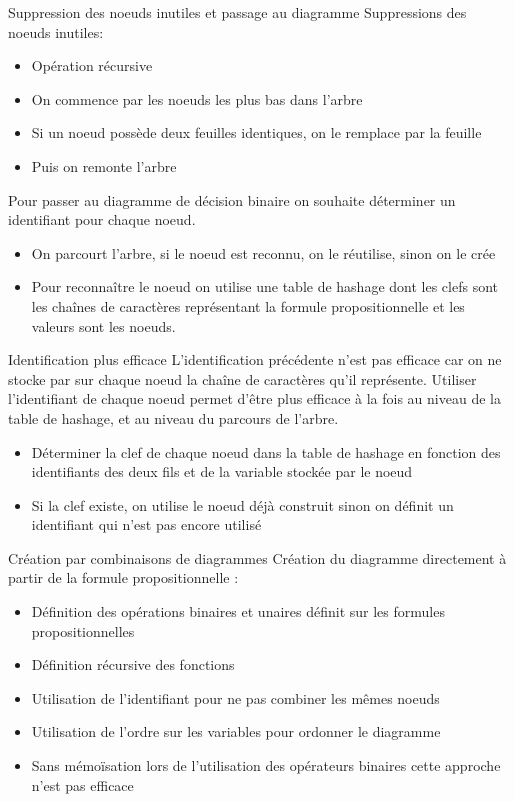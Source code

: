\documentclass{beamer}
\begin{document}
\begin{frame}{Suppression des noeuds inutiles et passage au diagramme}
Suppressions des noeuds inutiles:
\begin{itemize}
\item Opération récursive
\item On commence par les noeuds les plus bas dans l'arbre
\item Si un noeud possède deux feuilles identiques, on le remplace par la feuille
\item Puis on remonte l'arbre
\end{itemize}
Pour passer au diagramme de décision binaire on souhaite déterminer un identifiant pour chaque noeud.
\begin{itemize}
\item On parcourt l'arbre, si le noeud est reconnu, on le réutilise, sinon on le crée
\item Pour reconnaître le noeud on utilise une table de hashage dont les clefs sont les chaînes de caractères représentant la formule propositionnelle et les valeurs sont les noeuds.
\end{itemize}
\end{frame}

\begin{frame}{Identification plus efficace}
L'identification précédente n'est pas efficace car on ne stocke par sur chaque noeud la chaîne de caractères qu'il représente. Utiliser l'identifiant de chaque noeud permet d'être plus efficace à la fois au niveau de la table de hashage, et au niveau du parcours de l'arbre.
\begin{itemize}
\item Déterminer la clef de chaque noeud dans la table de hashage en fonction des identifiants des deux fils et de la variable stockée par le noeud
\item Si la clef existe, on utilise le noeud déjà construit sinon on définit un identifiant qui n'est pas encore utilisé
\end{itemize}
\end{frame}

\begin{frame}{Création par combinaisons de diagrammes}
Création du diagramme directement à partir de la formule propositionnelle :
\begin{itemize}
\item Définition des opérations binaires et unaires définit sur les formules propositionnelles
\item Définition récursive des fonctions
\item Utilisation de l'identifiant pour ne pas combiner les mêmes noeuds
\item Utilisation de l'ordre sur les variables pour ordonner le diagramme
\item Sans mémoïsation lors de l'utilisation des opérateurs binaires cette approche n'est pas efficace
\end{itemize}
\end{frame}
\end{document}
